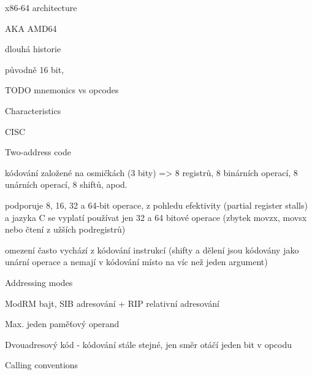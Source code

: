 %
%
%
%


\chap x86-64 architecture

AKA AMD64

dlouhá historie

původně 16 bit,

TODO mnemonics vs opcodes

\sec Characteristics

CISC

Two-address code

kódování založené na osmičkách (3 bity) => 8 registrů, 8 binárních operací, 8
unárních operací, 8 shiftů, apod.

podporuje 8, 16, 32 a 64-bit operace, z pohledu efektivity (partial register
stalls) a jazyka C se vyplatí používat jen 32 a 64 bitové operace (zbytek movzx,
movsx nebo čtení z užších podregistrů)

omezení často vychází z kódování instrukcí (shifty a dělení jsou kódovány jako unární operace
a nemají v kódování místo na víc než jeden argument)

\secc Addressing modes

ModRM bajt, SIB adresování + RIP relativní adresování

Max. jeden paměťový operand

Dvouadresový kód - kódování stále stejné, jen směr otáčí jeden bit v opcodu

\sec Calling conventions

